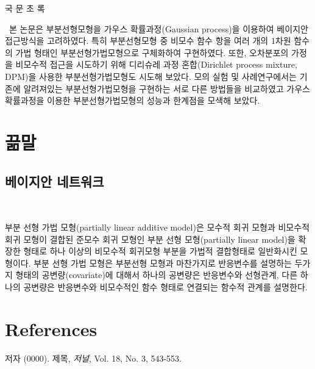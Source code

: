 \documentclass[12pt,a4paper,oneside]{book}
\theoremstyle{plain}
\theoremstyle{definition}
\theoremstyle{remark}
\theoremstyle{definition}
\numberwithin{equation}{chapter}
\begin{document}
\newpage{}

\begin{center}
{\Large 국 문 초 록}
\end{center}
\vspace{1cm} {\small \ \indent 본 논문은 부분선형모형을 가우스 확률과정(Gaussian process)을 이용하여 베이지안 접근방식을 고려하였다. 특히 부분선형모형 중 비모수 함수 항을 여러 개의 1차원 함수의 가법 형태인 부분선형가법모형으로 구체화하여 구현하였다. 또한, 오차분포의 가정을 비모수적 접근을 시도하기 위해 디리슈레 과정 혼합(Dirichlet process mixture, DPM)을 사용한 부분선형가법모형도 시도해 보았다. 모의 실험 및 사례연구에서는 기존에 알려져있는 부분선형가법모형을 구현하는 서로 다른 방법들을 비교하였고 가우스 확률과정을 이용한 부분선형가법모형의 성능과 한계점을 모색해 보았다.
}

 \tableofcontents
 \newpage
 \listoftables
 \newpage
 \listoffigures

\newpage

 \setcounter{page}{1}

\chapter{끎말}

\section{베이지안 네트워크}

{}\

부분 선형 가법 모형(partially linear additive model)은 모수적 회귀 모형과 비모수적 회귀 모형이 결합된 준모수 회귀 모형인 부분 선형 모형(partially linear model)을 확장한 형태로 하나 이상의 비모수적 회귀모형 부분을 가법적 결합형태로 일반화시킨 모형이다. 부분 선형 가법 모형은 부분선형 모형과 마찬가지로 반응변수를 설명하는 두가지 형태의 공변량(covariate)에 대해서 하나의 공변량은 반응변수와 선형관계, 다른 하나의 공변량은 반응변수와 비모수적인 함수 형태로 연결되는 함수적 관계를 설명한다.
\newpage %



\chapter*{References}
\begin{bibliography}{99}
\begin{enumerate}

     저자 (0000). 제목, \emph{저널}, Vol. 18, No. 3, 543-553.

\end{enumerate}
\end{bibliography}
\end{document}
